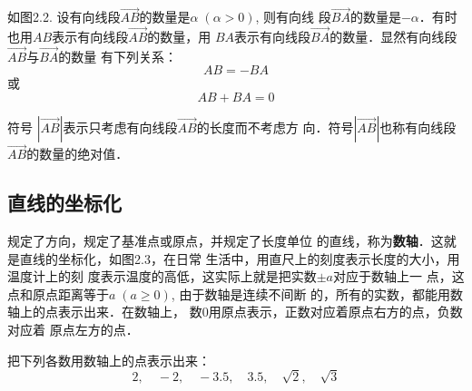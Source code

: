 如图2.2. 设有向线段$\Vec{AB}$的数量是$\alpha\; (\alpha>0)$, 则有向线
段$\Vec{BA}$的数量是$-\alpha$．有时也用$AB$表示有向线段$\Vec{AB}$的数量，用
${BA}$表示有向线段$\Vec{BA}$的数量．显然有向线段$\Vec{AB}$与$\Vec{BA}$的数量
有下列关系：
\[AB=-BA\]
或\[AB+BA=0\]

符号
$|\Vec{AB}|$表示只考虑有向线段$\Vec{AB}$的长度而不考虑方
向．符号$|\Vec{AB}|$也称有向线段$\Vec{AB}$的数量的绝对值．

\subsection{直线的坐标化}
规定了方向，规定了基准点或原点，并规定了长度单位
的直线，称为\textbf{数轴}．这就是直线的坐标化，如图2.3，在日常
生活中，用直尺上的刻度表示长度的大小，用温度计上的刻
度表示温度的高低，这实际上就是把实数$\pm a$对应于数轴上一
点，这点和原点距离等于$a\; (a\ge 0)$, 由于数轴是连续不间断
的，所有的实数，都能用数轴上的点表示出来．在数轴上，
数0用原点表示，正数对应着原点右方的点，负数对应着
原点左方的点．

\begin{figure}[htp]
    \centering
{}
    \caption{}
\end{figure}

\begin{example}
    把下列各数用数轴上的点表示出来：
\[2,\quad -2,\quad -3.5,\quad 3.5,\quad \sqrt{2},\quad \sqrt{3}\]
\end{example}


